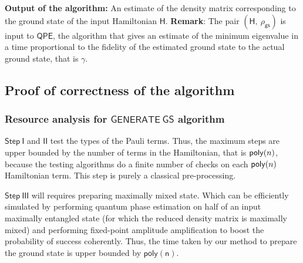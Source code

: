 \documentclass[11pt]{article}
\begin{document}
\textbf{Output of the algorithm:} An estimate of the density matrix corresponding to the ground state of the input Hamiltonian $\mathsf{H}$.
\newline
\textbf{Remark}:  The pair $\mathsf{( H,\ \rho_{gs} )}$ is input to $\mathsf{QPE}$, the algorithm that gives an estimate of the minimum eigenvalue in a time proportional to the fidelity of the estimated ground state to the actual ground state, that is $\gamma$.

\subsection{Proof of correctness of the algorithm}\label{sec: correctness}

\subsubsection{Resource analysis for $\mathsf{GENERATE\ GS}$ algorithm}
$\mathsf{Step\ I}$ and $\mathsf{II}$ test the types of the Pauli terms. Thus, the maximum steps are upper bounded by the number of terms in the Hamiltonian, that is $\mathsf{poly}(n)$, because the testing algorithms do a finite number of checks on each $\mathsf{poly}(n)$ Hamiltonian term. This step is purely a classical pre-processing. \par
$\mathsf{Step\ III}$ will requires preparing maximally mixed state. Which can be efficiently simulated by performing quantum phase estimation on half of an input maximally entangled state (for which the reduced density matrix is
maximally mixed) and performing fixed-point amplitude amplification to boost the probability of
success coherently. Thus, the time taken by our method to prepare the ground state is upper bounded by $\mathsf{poly(n)}$.

\end{document}
